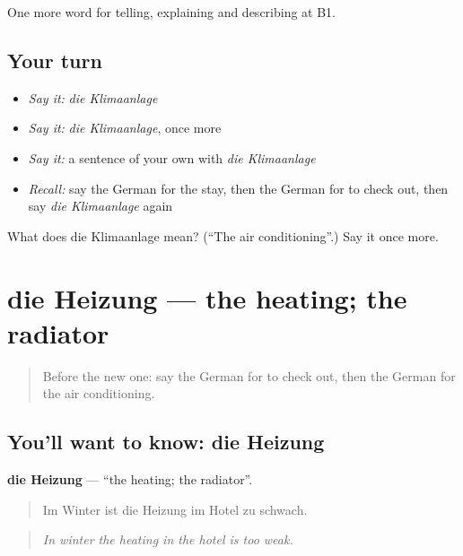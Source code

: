 \begin{grammarlens}[title={What you've built}]
One more word for telling, explaining and describing at B1.
\end{grammarlens}

\subsection*{Your turn}
\begin{itemize}
\raggedright
  \item \emph{Say it:} \emph{die Klimaanlage}
  \item \emph{Say it:} \emph{die Klimaanlage}, once more
  \item \emph{Say it:} a sentence of your own with \emph{die Klimaanlage}
  \item \emph{Recall:} say the German for the stay, then the German for to check out, then say \emph{die Klimaanlage} again
\end{itemize}

\begin{tcolorbox}[breakable,colback=teal!4,colframe=teal!35!black,title={Before you move on}]
What does die Klimaanlage mean? (\textquotedblleft{}The air conditioning\textquotedblright{}.) Say it once more.
\end{tcolorbox}
\section[die Heizung]{die Heizung — the heating; the radiator}

\label{lesson:GE-C427-heizung}



\begin{quote}
Before the new one: say the German for to check out, then the German for the air conditioning.
\end{quote}

\subsection*{You'll want to know: die Heizung}
\textbf{die Heizung} — \textquotedblleft{}the heating; the radiator\textquotedblright{}.

\begin{quote}
Im Winter ist die Heizung im Hotel zu schwach.
\end{quote}

\begin{quote}
\emph{In winter the heating in the hotel is too weak.}
\end{quote}

